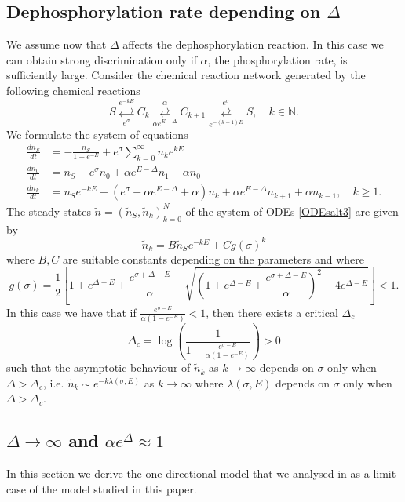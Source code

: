\documentclass{article}
\numberwithin{equation}{section}
\theoremstyle{plain}
\begin{document}
\subsection{Dephosphorylation rate depending on $\Delta $}
We assume now that $\Delta $ affects the dephosphorylation reaction. In this case we can obtain strong discrimination only if $\alpha $, the phosphorylation rate, is sufficiently large. 
Consider the chemical reaction network generated by the following chemical reactions 
\begin{equation}\label{cycleDelta1}
S \overset{e^{- k E} }{\underset{e^{\sigma }} \rightleftarrows} C_k  \overset{\alpha  }{\underset{\alpha e^{E-\Delta} }\rightleftarrows } C_{k+1} \overset{e^{\sigma  }}{\underset{e^{- (k+1)E }} \rightleftarrows} S, \quad  k  \in \mathbb N. 
\end{equation}
We formulate the system of equations 
\begin{align}\label{ODEsalt3}
    \frac{d n_S }{dt} &= - \frac{n_S}{1-e^{-E}} + e^{\sigma }  \sum_{k=0}^{\infty} n_k e^{k E } \nonumber \\
    \frac{d n_0 }{dt} &= n_S  - e^{\sigma } n_0 + \alpha e^{E- \Delta} n_1 - \alpha  n_0 \nonumber \\
        \frac{d n_k }{dt} &= n_S e^{- k E } - \left( e^{\sigma } + \alpha e^{E- \Delta} + \alpha \right)  n_k + \alpha e^{E- \Delta}  n_{k+1}  + \alpha  n_{k-1} , \quad k \geq 1. 
\end{align}
The steady states $\tilde{n}=(\tilde{n}_S, \tilde{n}_k)_{k=0}^N $ of the system of ODEs \eqref{ODEsalt3} are given by 
\[
\tilde{n}_k = B \tilde{n}_S e^{- k E } + C g(\sigma)^k 
\]
where $B, C$ are suitable constants depending on the parameters and where 
\[
g(\sigma) = \frac{1}{2 } \left[ 1+ e^{\Delta - E } + \frac{e^{\sigma + \Delta - E }}{ \alpha} - \sqrt{ \left( 1+ e^{\Delta - E } + \frac{e^{\sigma + \Delta - E }}{ \alpha} \right)^2  - 4 e^{\Delta - E }}  \right] < 1. 
\]
In this case we have that if $\frac{e^{\sigma- E }}{ \alpha (1- e^{- E } ) } <1 $, then there exists a critical $\Delta_c$  
\[
\Delta_c = \log\left(  \frac{1}{1-\frac{e^{\sigma- E }}{ \alpha (1- e^{- E } ) }  } \right)  >0 
\]
such that the asymptotic behaviour of $\tilde{n}_k$  as $k \to \infty $  depends on $\sigma $ only when $\Delta > \Delta_c$, i.e. $\tilde{n}_k \sim e^{ - k \lambda(\sigma, E) } $ as $k \to \infty $ where $\lambda (\sigma, E) $ depends on $\sigma $ only when $\Delta > \Delta_c$.




\subsection{$\Delta \to \infty $ and $\alpha e^{\Delta } \approx 1 $ }\label{sec:Delta to infty}
In this section we derive the one directional model that we analysed in \cite{franco2025stochastic} as a limit case of the model studied in this paper.
\end{document}
